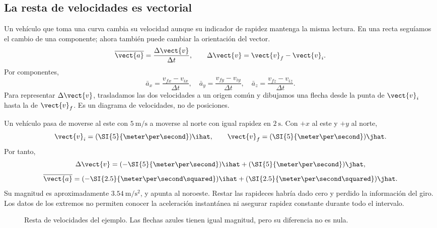 \subsection{La resta de velocidades es vectorial}

Un vehículo que toma una curva cambia su velocidad aunque su indicador de
rapidez mantenga la misma lectura. En una recta seguíamos el cambio de una
componente; ahora también puede cambiar la orientación del vector.
\[ \overline{\vect{a}}=\frac{\Delta\vect{v}}{\Delta t},
\qquad \Delta\vect{v}=\vect{v}_f-\vect{v}_i. \]
Por componentes,
\[ \bar a_x=\frac{v_{fx}-v_{ix}}{\Delta t},\quad
\bar a_y=\frac{v_{fy}-v_{iy}}{\Delta t},\quad
\bar a_z=\frac{v_{fz}-v_{iz}}{\Delta t}. \]
Para representar \(\Delta\vect{v}\), trasladamos las dos velocidades a
un origen común y dibujamos una flecha desde la punta de \(\vect{v}_i\)
hasta la de \(\vect{v}_f\). Es un diagrama de velocidades, no de posiciones.

\begin{ejemplo}
Un vehículo pasa de moverse al este con \(\SI{5}{\meter\per\second}\)
a moverse al norte con igual rapidez en \(\SI{2}{\second}\). Con \(+x\)
al este y \(+y\) al norte,
\[ \vect{v}_i=(\SI{5}{\meter\per\second})\ihat,
\qquad \vect{v}_f=(\SI{5}{\meter\per\second})\jhat. \]
Por tanto,
\[ \Delta\vect{v}=(-\SI{5}{\meter\per\second})\ihat
+(\SI{5}{\meter\per\second})\jhat, \]
\[ \overline{\vect{a}}=(-\SI{2.5}{\meter\per\second\squared})\ihat
+(\SI{2.5}{\meter\per\second\squared})\jhat. \]
Su magnitud es aproximadamente \(\SI{3.54}{\meter\per\second\squared}\),
y apunta al noroeste. Restar las rapideces habría dado cero y perdido la
información del giro. Los datos de los extremos no permiten conocer la
aceleración instantánea ni asegurar rapidez constante durante todo el intervalo.
\end{ejemplo}

\begin{figure}[htbp]
    \centering
    \caption{Resta de velocidades del ejemplo. Las flechas azules tienen
    igual magnitud, pero su diferencia no es nula.}
\end{figure}

